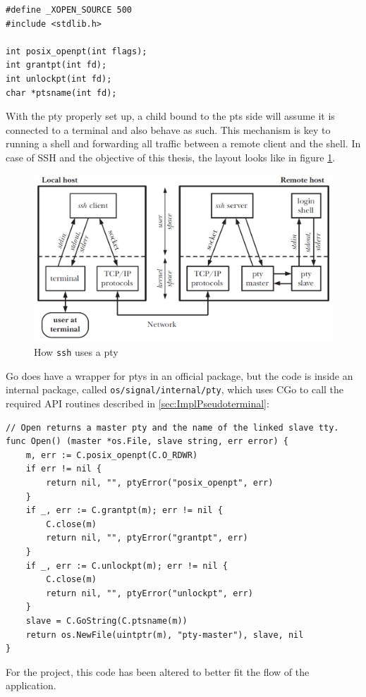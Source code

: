 \documentclass[10pt,a4paper,titlepage,twoside,english,final]{zhawreprt}
\begin{document}
\setlistingC
\begin{lstlisting}[caption={\gls{pty} related \gls{Linux} \gls{API} functions},label=lst:PtyFunctions]
#define _XOPEN_SOURCE 500
#include <stdlib.h>

int posix_openpt(int flags);
int grantpt(int fd);
int unlockpt(int fd);
char *ptsname(int fd);
\end{lstlisting}

With the \gls{pty} properly set up, a child bound to the \gls{pts} side will assume it is connected to a \gls{terminal} and also behave as such.
This mechanism is key to running a \gls{shell} and forwarding all traffic between a remote client and the \gls{shell}.
In case of \gls{SSH} and the objective of this thesis, the layout looks like in figure \ref{fig:HowSSHUsesPty}.

\begin{figure}[ht]
\includegraphics[width=\textwidth]{PseudoterminalSSH}
\caption{How \texttt{ssh} uses a \gls{pty} \citep[p.1378]{KerriskTLPI}}
\label{fig:HowSSHUsesPty}
\end{figure}

\gls{Go} does have a wrapper for \glspl{pty} in an official package, but the code is inside an internal package, called \texttt{os/signal/internal/pty}, which uses \gls{CGo} to call the required \gls{API} routines described in \ref{sec:ImplPseudoterminal}:

\setlistingGo
\begin{lstlisting}[caption={\gls{Go}'s \gls{pty} wrapper},label=lst:GoPty]
// Open returns a master pty and the name of the linked slave tty.
func Open() (master *os.File, slave string, err error) {
	m, err := C.posix_openpt(C.O_RDWR)
	if err != nil {
		return nil, "", ptyError("posix_openpt", err)
	}
	if _, err := C.grantpt(m); err != nil {
		C.close(m)
		return nil, "", ptyError("grantpt", err)
	}
	if _, err := C.unlockpt(m); err != nil {
		C.close(m)
		return nil, "", ptyError("unlockpt", err)
	}
	slave = C.GoString(C.ptsname(m))
	return os.NewFile(uintptr(m), "pty-master"), slave, nil
}
\end{lstlisting}
For the project, this code has been altered to better fit the flow of the application.
\end{document}
